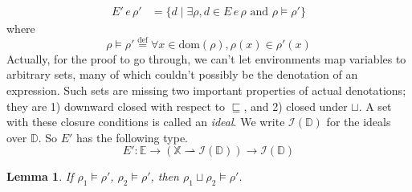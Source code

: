 \documentclass{tufte-handout}
\newcommand{\defeq}[0]{\overset{\mathrm{def}}{=}}
\newcommand{\pto}[0]{\rightharpoonup}
\newcommand{\VAR}[0]{\mathbb{X}}
\newtheorem{lemma}[theorem]{Lemma}
\begin{document}
\begin{align*}
  E'\,e\,\rho' &=
  \{ d \mid \exists \rho, d \in E\,e\,\rho
  \text{ and } \rho \models \rho' \}
\end{align*}
where
\[
\rho\models\rho' \defeq \forall x \in\mathrm{dom}(\rho),\rho(x)\in \rho'(x)
\]
Actually, for the proof to go through, we can't let environments map
variables to arbitrary sets, many of which couldn't possibly be the
denotation of an expression. Such sets are missing two important
properties of actual denotations; they are 1) downward closed with
respect to $\sqsubseteq$, and 2) closed under $\sqcup$. A set with
these closure conditions is called an \emph{ideal}. We write
$\mathcal{I}(\mathbb{D})$ for the ideals over $\mathbb{D}$.  So $E'$
has the following type.
\[
  E' : \mathbb{E} \to (\VAR\pto \mathcal{I}(\mathbb{D}))
  \to \mathcal{I}(\mathbb{D}) 
\]

\begin{lemma}
  \label{lem:env-less-model}
  If $\rho_1 \models \rho'$, $\rho_2 \models \rho'$,
  then $\rho_1 \sqcup \rho_2 \models \rho'$.
\end{lemma}
\end{document}
